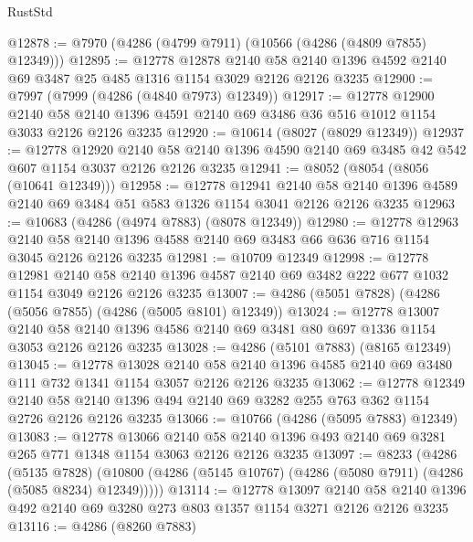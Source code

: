 \begin{lexlean}{RustStd}
\begin{coremodule}
{\begin{coremodule}
{{{{{{{{{{{{{{{{@12878 := @7970 (@4286 (@4799 @7911) (@10566 (@4286 (@4809 @7855) @12349)))
@12895 := @12778
    @12878
    @2140
    @58
    @2140
    @1396
    @4592
    @2140
    @69
    @3487
    @25
    @485
    @1316
    @1154
    @3029
    @2126
    @2126
    @3235
@12900 := @7997 (@7999 (@4286 (@4840 @7973) @12349))
@12917 := @12778
    @12900
    @2140
    @58
    @2140
    @1396
    @4591
    @2140
    @69
    @3486
    @36
    @516
    @1012
    @1154
    @3033
    @2126
    @2126
    @3235
@12920 := @10614 (@8027 (@8029 @12349))
@12937 := @12778
    @12920
    @2140
    @58
    @2140
    @1396
    @4590
    @2140
    @69
    @3485
    @42
    @542
    @607
    @1154
    @3037
    @2126
    @2126
    @3235
@12941 := @8052 (@8054 (@8056 (@10641 @12349)))
@12958 := @12778
    @12941
    @2140
    @58
    @2140
    @1396
    @4589
    @2140
    @69
    @3484
    @51
    @583
    @1326
    @1154
    @3041
    @2126
    @2126
    @3235
@12963 := @10683 (@4286 (@4974 @7883) (@8078 @12349))
@12980 := @12778
    @12963
    @2140
    @58
    @2140
    @1396
    @4588
    @2140
    @69
    @3483
    @66
    @636
    @716
    @1154
    @3045
    @2126
    @2126
    @3235
@12981 := @10709 @12349
@12998 := @12778
    @12981
    @2140
    @58
    @2140
    @1396
    @4587
    @2140
    @69
    @3482
    @222
    @677
    @1032
    @1154
    @3049
    @2126
    @2126
    @3235
@13007 := @4286 (@5051 @7828) (@4286 (@5056 @7855) (@4286 (@5005 @8101) @12349))
@13024 := @12778
    @13007
    @2140
    @58
    @2140
    @1396
    @4586
    @2140
    @69
    @3481
    @80
    @697
    @1336
    @1154
    @3053
    @2126
    @2126
    @3235
@13028 := @4286 (@5101 @7883) (@8165 @12349)
@13045 := @12778
    @13028
    @2140
    @58
    @2140
    @1396
    @4585
    @2140
    @69
    @3480
    @111
    @732
    @1341
    @1154
    @3057
    @2126
    @2126
    @3235
@13062 := @12778
    @12349
    @2140
    @58
    @2140
    @1396
    @494
    @2140
    @69
    @3282
    @255
    @763
    @362
    @1154
    @2726
    @2126
    @2126
    @3235
@13066 := @10766 (@4286 (@5095 @7883) @12349)
@13083 := @12778
    @13066
    @2140
    @58
    @2140
    @1396
    @493
    @2140
    @69
    @3281
    @265
    @771
    @1348
    @1154
    @3063
    @2126
    @2126
    @3235
@13097 := @8233
    (@4286
      (@5135 @7828)
      (@10800 (@4286 (@5145 @10767) (@4286 (@5080 @7911) (@4286 (@5085 @8234) @12349)))))
@13114 := @12778
    @13097
    @2140
    @58
    @2140
    @1396
    @492
    @2140
    @69
    @3280
    @273
    @803
    @1357
    @1154
    @3271
    @2126
    @2126
    @3235
@13116 := @4286 (@8260 @7883)
}}}}}}}}}}}}}}}}
\end{coremodule}}
\end{coremodule}
\end{lexlean}
